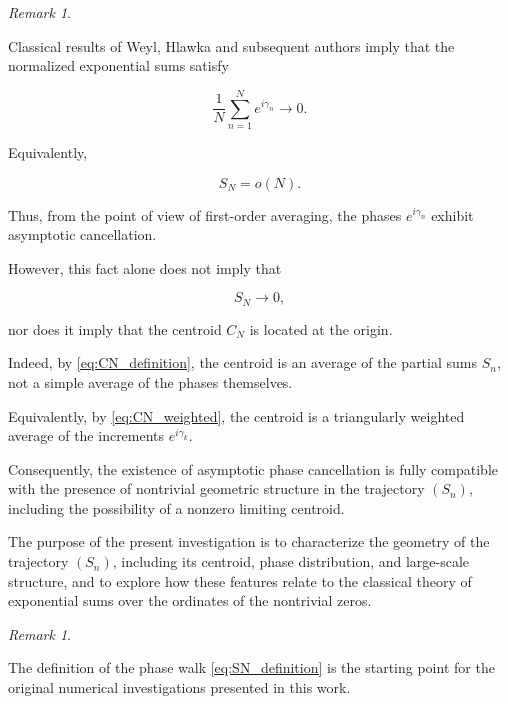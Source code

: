 \documentclass[11pt]{amsart}
\numberwithin{equation}{section}
\theoremstyle{plain}
\theoremstyle{definition}
\theoremstyle{remark}
\newtheorem{remark}[theorem]{Remark}
\begin{document}
\begin{remark}
\label{rem:equidistribution_not_centroid}

Classical results of Weyl, Hlawka and subsequent authors imply that the
normalized exponential sums satisfy

\begin{equation}
\frac{1}{N}
\sum_{n=1}^{N}
e^{i\gamma_n}
\longrightarrow
0.
\label{eq:normalized_phase_cancellation}
\end{equation}

Equivalently,

\begin{equation}
S_N=o(N).
\label{eq:SN_sublinear_growth}
\end{equation}

Thus, from the point of view of first-order averaging,
the phases \(e^{i\gamma_n}\) exhibit asymptotic cancellation.

However, this fact alone does not imply that

\begin{equation}
S_N
\longrightarrow
0,
\label{eq:SN_zero_limit}
\end{equation}

nor does it imply that the centroid \(C_N\) is located at the origin.

Indeed, by \eqref{eq:CN_definition},
the centroid is an average of the partial sums \(S_n\), not a simple
average of the phases themselves.

Equivalently, by \eqref{eq:CN_weighted},
the centroid is a triangularly weighted average of the increments
\(e^{i\gamma_k}\).

Consequently, the existence of asymptotic phase cancellation is fully
compatible with the presence of nontrivial geometric structure in the
trajectory \((S_n)\), including the possibility of a nonzero limiting
centroid.

The purpose of the present investigation is to characterize the
geometry of the trajectory \((S_n)\), including its centroid,
phase distribution, and large-scale structure, and to explore how
these features relate to the classical theory of exponential sums over
the ordinates of the nontrivial zeros.

\end{remark}

\begin{remark}
\label{rem:original_object}

The definition of the phase walk
\eqref{eq:SN_definition}
is the starting point for the original numerical investigations
presented in this work.

\end{remark}
\end{document}
